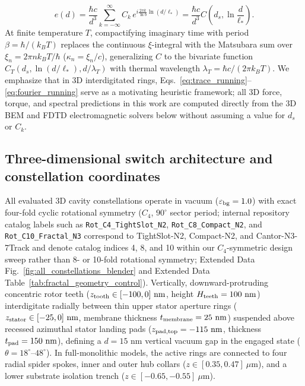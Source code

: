 \documentclass[pdflatex,sn-nature]{sn-jnl}
\begin{document}
\begin{equation}
e(d) = \frac{\hbar c}{d^3} \sum_{k=-\infty}^{\infty} C_k \, e^{i \frac{2\pi k}{\ln b} \ln(d/\ell_*)} = \frac{\hbar c}{d^3} C\!\left(d_s, \ln\frac{d}{\ell_*}\right).
\end{equation}
At finite temperature $T$, compactifying imaginary time with period $\beta = \hbar/(k_B T)$ replaces the continuous $\xi$-integral with the Matsubara sum over $\xi_n = 2\pi n k_B T/\hbar$ ($\kappa_n = \xi_n / c$), generalizing $C$ to the bivariate function $C_T(d_s, \ln(d/\ell_*), d/\lambda_T)$ with thermal wavelength $\lambda_T = \hbar c / (2\pi k_B T)$\cite{gordon2026prd}. We emphasize that in 3D interdigitated rings, Eqs.~\eqref{eq:trace_running}--\eqref{eq:fourier_running} serve as a motivating heuristic framework; all 3D force, torque, and spectral predictions in this work are computed directly from the 3D BEM and FDTD electromagnetic solvers below without assuming a value for $d_s$ or $C_k$.

\subsection*{Three-dimensional switch architecture and constellation coordinates}
All evaluated 3D cavity constellations operate in vacuum ($\varepsilon_{\rm bg}=1.0$) with exact four-fold cyclic rotational symmetry ($C_4$, $90^\circ$ sector period; internal repository catalog labels such as \texttt{Rot\_C4\_TightSlot\_N2}, \texttt{Rot\_C8\_Compact\_N2}, and \texttt{Rot\_C10\_Fractal\_N3} correspond to TightSlot-N2, Compact-N2, and Cantor-N3-7Track and denote catalog indices 4, 8, and 10 within our $C_4$-symmetric design sweep rather than 8- or 10-fold rotational symmetry; Extended Data Fig.~\ref{fig:all_constellations_blender} and Extended Data Table~\ref{tab:fractal_geometry_control}). Vertically, downward-protruding concentric rotor teeth ($z_{\rm tooth} \in [-100, 0]\text{ nm}$, height $H_{\rm teeth} = 100\text{ nm}$) interdigitate radially between thin upper stator aperture rings ($z_{\rm stator} \in [-25, 0]\text{ nm}$, membrane thickness $t_{\rm membrane} = 25\text{ nm}$) suspended above recessed azimuthal stator landing pads ($z_{\rm pad,top} = -115\text{ nm}$, thickness $t_{\rm pad} = 150\text{ nm}$), defining a $d = 15\text{ nm}$ vertical vacuum gap in the engaged state ($\theta = 18^\circ\text{--}48^\circ$). In full-monolithic models, the active rings are connected to four radial spider spokes, inner and outer hub collars ($z \in [0.35, 0.47]\ \mu\text{m}$), and a lower substrate isolation trench ($z \in [-0.65, -0.55]\ \mu\text{m}$).
\end{document}
